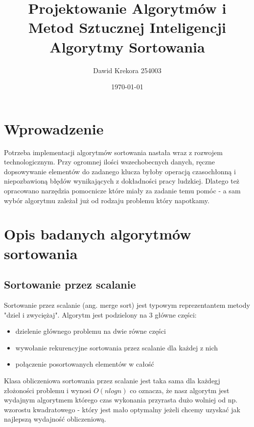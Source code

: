 \documentclass[10pt,a4paper]{article} %
\begin{document}
\title{Projektowanie Algorytmów i Metod Sztucznej Inteligencji \\
	   \large Algorytmy Sortowania}
\author{Dawid Krekora 254003}
\date{\today}
\maketitle
\tableofcontents
	\newpage
	\section{Wprowadzenie}
	Potrzeba implementacji algorytmów sortowania nastała wraz z rozwojem technologicznym. Przy ogromnej ilości wszechobecnych danych, ręczne dopsowywanie elementów do zadanego klucza byłoby operacją czasochłonną i niepozbawioną błędów wynikających z dokładności pracy ludzkiej. Dlatego też opracowano narzędzia pomocnicze które miały za zadanie temu pomóc - a sam wybór algorytmu zależał już od rodzaju problemu który napotkamy.
	\section{Opis badanych algorytmów sortowania}
	\subsection{Sortowanie przez scalanie}
	Sortowanie przez scalanie (ang. merge sort) jest typowym reprezentantem metody "dziel i zwyciężaj". Algorytm jest podzielony na 3 główne części:
	\begin{itemize}
		\item dzielenie głównego problemu na dwie równe części
		\item wywołanie rekurencyjne sortowania przez scalanie dla każdej z nich
		\item połączenie posortowanych elementów w całość
	\end{itemize}
	Klasa obliczeniowa sortowania przez scalanie jest taka sama dla każdegj złożoności problemu i wynosi $ O (n log n) $ co oznacza, że nasz algorytm jest wydajnym algorytmem którego czas wykonania przyrasta dużo wolniej od np. wzorostu kwadratowego - który jest mało optymalny jeżeli chcemy uzyskać jak najlepszą wydajność obliczeniową.
\end{document}
